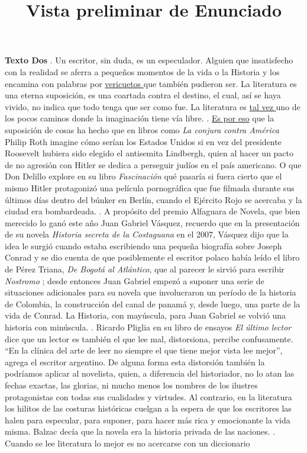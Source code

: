 \documentclass[a4paper,12pt]{article}\usepackage[utf8]{inputenc}\usepackage[spanish]{babel}\usepackage{times}
\title{Vista preliminar de Enunciado}
\begin{document}
\twocolumn 

\maketitle

\textbf{ Texto Dos } . Un escritor, sin duda, es un especulador. Alguien que insatisfecho con la realidad se aferra a pequeños momentos de la vida o la Historia y los encamina con palabras por \underline{ vericuetos } que también pudieron ser. La literatura es una eterna suposición, es una coartada contra el destino, el cual, así se haya vivido, no indica que todo tenga que ser como fue. La literatura es \underline{ tal vez } uno de los pocos caminos donde la imaginación tiene vía libre. . \underline{ Es por eso} que la suposición de cosas ha hecho que en libros como \textit{ La conjura contra América } Philip Roth imagine cómo serían los Estados Unidos si en vez del presidente Roosevelt hubiera sido elegido el antisemita Lindbergh, quien al hacer un pacto de no agresión con Hitler se dedica a perseguir judíos en el país americano. O que Don Delillo explore en su libro \textit{ Fascinación} qué pasaría si fuera cierto que el mismo Hitler protagonizó una película pornográfica que fue filmada durante sus últimos días dentro del búnker en Berlín, cuando el Ejército Rojo se acercaba y la ciudad era bombardeada. . A propósito del premio Alfaguara de Novela, que bien merecido lo ganó este año Juan Gabriel Vásquez, recuerdo que en la presentación de su novela  \textit{ Historia secreta de la Costaguana } en el 2007, Vásquez dijo que la idea le surgió cuando estaba escribiendo una pequeña biografía sobre Joseph Conrad y se dio cuenta de que posiblemente el escritor polaco había leído el libro de Pérez Triana, \textit{De Bogotá al Atlántico}, que al parecer le sirvió para escribir  \textit{ Nostromo }; desde entonces Juan Gabriel empezó a suponer una serie de situaciones adicionales para su novela que involucraron un período de la historia de Colombia, la construcción del canal de panamá y, desde luego, una parte de la vida de Conrad. La Historia, con mayúscula, para Juan Gabriel se volvió una historia con minúscula. . Ricardo Pliglia en su libro de ensayos \textit{ El último lector} dice que un lector es también el que lee mal, distorsiona, percibe confusamente. “En la clínica del arte de leer no siempre el que tiene mejor vista lee mejor”, agrega el escritor argentino. De alguna forma esta distorsión también la podríamos aplicar al novelista, quien, a diferencia del historiador, no lo atan las fechas exactas, las glorias, ni mucho menos los nombres de los ilustres protagonistas con todas sus cualidades y virtudes. Al contrario, en la literatura los hilitos de las costuras históricas cuelgan a la espera de que los escritores las halen para especular, para suponer, para hacer más rica y emocionante la vida misma. Balzac decía que la novela era la historia privada de las naciones. . Cuando se lee literatura lo mejor es no acercarse con un diccionario 
\end{document}
